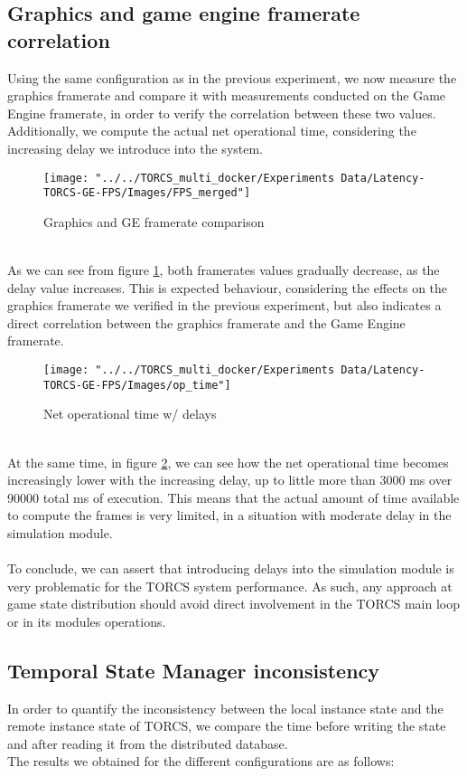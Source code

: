 \subsection{Graphics and game engine framerate correlation}
Using the same configuration as in the previous experiment, we now measure the graphics framerate and compare it with measurements conducted on the Game Engine framerate, in order to verify the correlation between these two values. Additionally, we compute the actual net operational time, considering the increasing delay we introduce into the system.
\begin{figure}[h!]
	\centering
	\texttt{[image: "../../TORCS\_multi\_docker/Experiments Data/Latency-TORCS-GE-FPS/Images/FPS\_merged"]}
	\caption[Graphics and GE framerate comparison]{Graphics and GE framerate comparison}
	\label{fig:graphics-GE-fps}
\end{figure}
\\ As we can see from figure \ref{fig:graphics-GE-fps}, both framerates values gradually decrease, as the delay value increases. This is expected behaviour, considering the effects on the graphics framerate we verified in the previous experiment, but also indicates a direct correlation between the graphics framerate and the Game Engine framerate. \\
\begin{figure}[h!]
	\centering
	\texttt{[image: "../../TORCS\_multi\_docker/Experiments Data/Latency-TORCS-GE-FPS/Images/op\_time"]}
	\caption[Net operational time w/ delays]{Net operational time w/ delays}
	\label{fig:op-time}
\end{figure}
\\ At the same time, in figure \ref{fig:op-time}, we can see how the net operational time becomes increasingly lower with the increasing delay, up to little more than 3000 ms over 90000 total ms of execution. This means that the actual amount of time available to compute the frames is very limited, in a situation with moderate delay in the simulation module. \\ \\
To conclude, we can assert that introducing delays into the simulation module is very problematic for the TORCS system performance. As such, any approach at game state distribution should avoid direct involvement in the TORCS main loop or in its modules operations.

\subsection{Temporal State Manager inconsistency}
In order to quantify the inconsistency between the local instance state and the remote instance state of TORCS, we compare the time before writing the state and after reading it from the distributed database. \\ The results we obtained for the different configurations are as follows:

